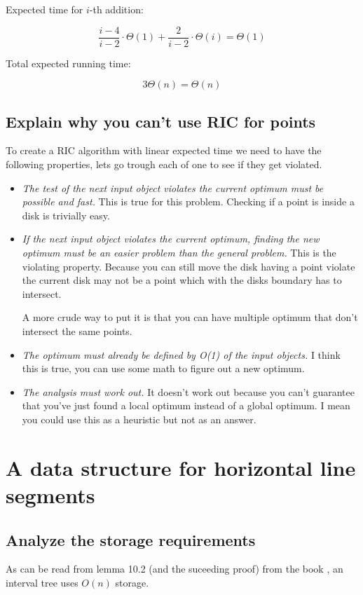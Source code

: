 \documentclass{article}
\begin{document}
Expected time for $i$-th addition:

\[\frac{i-4}{i-2}\cdot\Theta(1)+\frac{2}{i-2}\cdot\Theta(i)=\Theta(1)\]

Total expected running time:

\[3\Theta(n) = \Theta(n)\]

\subsection{Explain why you can't use RIC for points}
To create a RIC algorithm with linear expected time we need to have the
following properties, lets go trough each of one to see if they get violated.

\begin{itemize}
	\item \emph{The test of the next input object violates the current
		optimum must be possible and fast.}
		This is true for this problem. Checking if a point is inside a disk
		is trivially easy.
	\item \emph{If the next input object violates the current optimum,
		finding the new optimum must be an easier problem than the general
		problem.}
		This is the violating property. Because you can still move
		the disk having a point violate the current disk may not be a point
		which with the disks boundary has to intersect.

		A more crude way to put it is that you can have multiple optimum
		that don't intersect the same points.
	\item \emph{The optimum must already be defined by O(1) of the input
		objects.}
		I think this is true, you can use some math to figure out a new
		optimum.
	\item \emph{The analysis must work out.}
		It doesn't work out because you can't guarantee that you've just
		found a local optimum instead of a global optimum. I mean you
		could use this as a heuristic but not as an answer.
\end{itemize}
\section{A data structure for horizontal line segments}
\subsection{Analyze the storage requirements}
As can be read from lemma 10.2 (and the suceeding proof) from
the book \cite{book}, an interval tree uses $O(n)$ storage.
\end{document}

